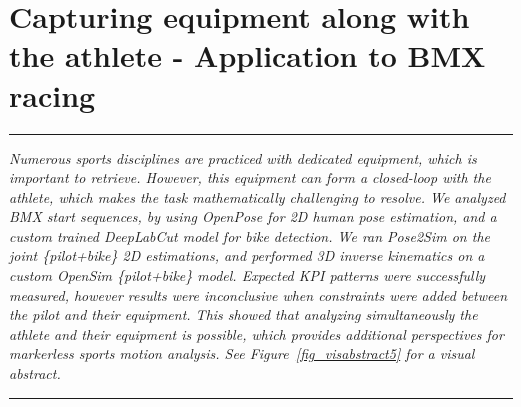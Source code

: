 
\lhead[\fancyplain{}{\leftmark}]%
      {\fancyplain{}{}} %
\chead[\fancyplain{}{}]%
      {\fancyplain{}{}}
\rhead[\fancyplain{}{}]%
      {\fancyplain{}{\rightmark}}%
\lfoot[\fancyplain{}{}]%
      {\fancyplain{}{}}
\cfoot[\fancyplain{}{\thepage}]%
      {\fancyplain{}{\thepage}} %
\rfoot[\fancyplain{}{}]%
     {\fancyplain{}{\scriptsize}}



\chapter{Capturing equipment along with the athlete - Application to BMX racing}
\label{ch:7}


\begin{center}
\rule{0.7\linewidth}{.5pt}
\begin{minipage}{0.7\linewidth}
\smallskip

\textit{Numerous sports disciplines are practiced with dedicated equipment, which is important to retrieve. However, this equipment can form a closed-loop with the athlete, which makes the task mathematically challenging to resolve. We analyzed BMX start sequences, by using OpenPose for 2D human pose estimation, and a custom trained DeepLabCut model for bike detection. We ran Pose2Sim on the joint \{pilot+bike\} 2D estimations, and performed 3D inverse kinematics on a custom OpenSim \{pilot+bike\} model. Expected KPI patterns were successfully measured, however results were inconclusive when constraints were added between the pilot and their equipment. This showed that analyzing simultaneously the athlete and their equipment is possible, which provides additional perspectives for markerless sports motion analysis.\newline
See Figure~\ref{fig_visabstract5} for a visual abstract.
}

\end{minipage}
\smallskip
\rule{0.7\linewidth}{.5pt}
\end{center}

